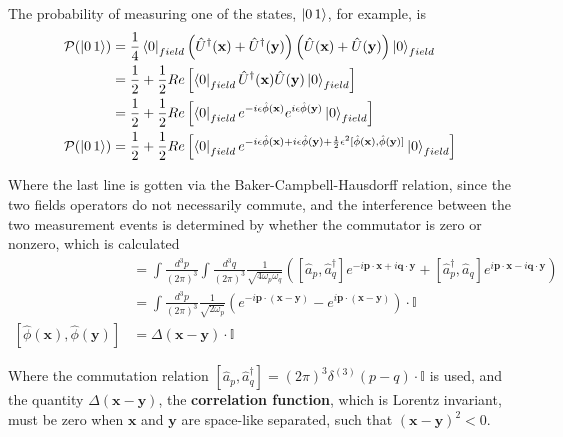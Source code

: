 \noindent The probability of measuring one of the states, $\ket{0 \, 1}$, for example, is 
\begin{align}
\mathcal{P}(\ket{0 \, 1}) &= \frac{1}{4} \bra{0}_{field} \left( \hat{U}^\dagger(\textbf{x}) + \hat{U}^\dagger(\textbf{y}) \right) \left( \hat{U}(\textbf{x}) + \hat{U}(\textbf{y}) \right)  \ket{0}_{field} \\
&= \frac{1}{2} + \frac{1}{2} Re \left[ \bra{0}_{field} \hat{U}^\dagger(\textbf{x}) \hat{U}(\textbf{y}) \ket{0}_{field} \right] \\
&= \frac{1}{2} + \frac{1}{2} Re \left[ \bra{0}_{field} e^{-i \epsilon \hat{\phi}(\textbf{x})} e^{i \epsilon \hat{\phi}(\textbf{y})} \ket{0}_{field} \right] \\
\mathcal{P}(\ket{0 \, 1}) &= \frac{1}{2} + \frac{1}{2} Re \left[ \bra{0}_{field} e^{-i \epsilon \hat{\phi}(\textbf{x})+ i \epsilon \hat{\phi}(\textbf{y}) +\frac{1}{2} \epsilon^2 [ \hat{\phi}(\textbf{x}), \hat{\phi}(\textbf{y}) ] } \ket{0}_{field} \right] \\
\end{align}

\noindent Where the last line is gotten via the Baker-Campbell-Hausdorff relation, since the two fields operators do not necessarily commute, and the interference between the two measurement events is determined by whether the commutator is zero or nonzero, which is calculated \\
\begin{align}
[ \hat{\phi}(\textbf{x}), \hat{\phi}(\textbf{y}) ] &= \int \frac{d^3 p}{(2\pi)^3} \int \frac{d^3 q}{(2\pi)^3} \frac{1}{\sqrt{4 \omega_p \omega_q}} \left( [\hat{a}_p, \hat{a}_q^\dagger ] e^{-i \textbf{p} \cdot \textbf{x} + i \textbf{q} \cdot \textbf{y}} + [\hat{a}_p^\dagger, \hat{a}_q ] e^{i \textbf{p} \cdot \textbf{x} - i \textbf{q} \cdot \textbf{y}} \right) \\
&= \int \frac{d^3 p}{(2\pi)^3} \frac{1}{\sqrt{2 \omega_p}} \left( e^{-i \textbf{p} \cdot (\textbf{x}-\textbf{y})} - e^{i \textbf{p} \cdot (\textbf{x}-\textbf{y})} \right) \cdot \mathbb{I} \\
[ \hat{\phi}(\textbf{x}), \hat{\phi}(\textbf{y}) ] &= \Delta (\textbf{x} - \textbf{y}) \cdot \mathbb{I}
\end{align}

\noindent Where the commutation relation $[\hat{a}_p, \hat{a}_q^\dagger] = (2\pi)^3 \delta^{(3)} (p-q) \cdot \mathbb{I}$ is used, and the quantity $\Delta (\textbf{x} - \textbf{y})$, the \textbf{correlation function}, which is Lorentz invariant, must be zero when $\textbf{x}$ and $\textbf{y}$ are space-like separated, such that $(\textbf{x} - \textbf{y})^2 < 0$. \\

